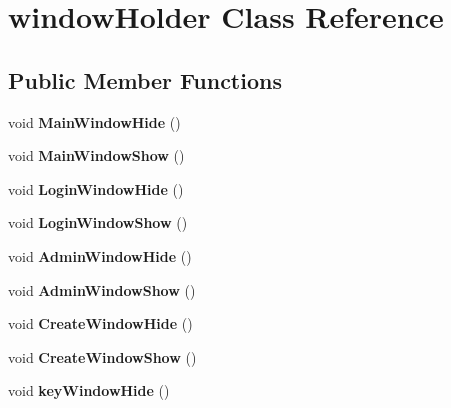 \hypertarget{classwindow_holder}{}\section{window\+Holder Class Reference}
\label{classwindow_holder}
\subsection*{Public Member Functions}
\begin{DoxyCompactItemize}
\item 
\mbox{\label{classwindow_holder_ab49515f6a1641726cc90cfe25c590dc9}} 
void {\bfseries Main\+Window\+Hide} ()
\item 
\mbox{\label{classwindow_holder_a896305f2187010582bec985c69732f50}} 
void {\bfseries Main\+Window\+Show} ()
\item 
\mbox{\label{classwindow_holder_ab8a34349cac278a51b2bbf58c32d2c8c}} 
void {\bfseries Login\+Window\+Hide} ()
\item 
\mbox{\label{classwindow_holder_ad360d5183c9b9121ee3533f55228cafe}} 
void {\bfseries Login\+Window\+Show} ()
\item 
\mbox{\label{classwindow_holder_aa459aa3bd4a409b838ea2c0b1be67f37}} 
void {\bfseries Admin\+Window\+Hide} ()
\item 
\mbox{\label{classwindow_holder_a0c97d703dc433ee2e20b89efa849780c}} 
void {\bfseries Admin\+Window\+Show} ()
\item 
\mbox{\label{classwindow_holder_a816f65a254c2636fa7221d401809bcc0}} 
void {\bfseries Create\+Window\+Hide} ()
\item 
\mbox{\label{classwindow_holder_af35553dd4cd1f109ce3b72835e3d7180}} 
void {\bfseries Create\+Window\+Show} ()
\item 
\mbox{\label{classwindow_holder_ad1027581c042b76dea11b819da81b834}} 
void {\bfseries key\+Window\+Hide} ()
\item 

\end{DoxyCompactItemize}
